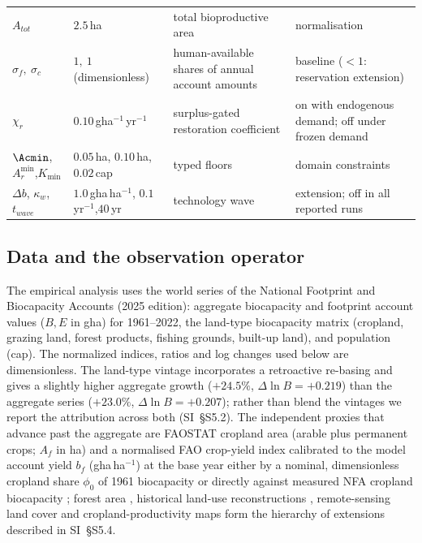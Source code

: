 \begin{table}[!htbp]
\begin{tabularx}{\textwidth}{@{}>{\raggedright\arraybackslash}p{} >{\raggedright\arraybackslash}p{} >{\raggedright\arraybackslash}X >{\raggedright\arraybackslash}p{}@{}}
$A_{tot}$ & $2.5$\,ha & total bioproductive area & normalisation \\
$\sigma_f,\ \sigma_c$ & $1,\ 1$ (dimensionless) & human-available shares of annual account amounts & baseline ($<1$: reservation extension) \\
$\chi_r$ & $0.10$\,gha$^{-1}$\,yr$^{-1}$ & surplus-gated restoration coefficient & on with endogenous demand; off under frozen demand \\
$\Acmin$, $A_r^{\min}$,\newline $K_{\min}$ & $0.05$\,ha, $0.10$\,ha,\newline $0.02$\,cap & typed floors & domain constraints \\
$\Delta b$, $\kappa_w$,\newline $t_{wave}$ & $1.0$\,gha\,ha$^{-1}$, $0.1$\,yr$^{-1}$,\newline $40$\,yr & technology wave & extension; off in all reported runs \\
\bottomrule
\end{tabularx}
\end{table}

\subsection{Data and the observation operator}\label{sec:data}

The empirical analysis uses the world series of the National Footprint and Biocapacity Accounts (2025 edition): aggregate biocapacity and footprint account values ($B,E$ in gha) for 1961--2022, the land-type biocapacity matrix (cropland, grazing land, forest products, fishing grounds, built-up land), and population (cap). The normalized indices, ratios and log changes used below are dimensionless. The land-type vintage incorporates a retroactive re-basing and gives a slightly higher aggregate growth ($+24.5\%$, $\Delta\ln B=+0.219$) than the aggregate series ($+23.0\%$, $\Delta\ln B=+0.207$); rather than blend the vintages we report the attribution across both (SI~\S S5.2). The independent proxies that advance past the aggregate are FAOSTAT cropland area (arable plus permanent crops; $A_f$ in ha) and a normalised FAO crop-yield index calibrated to the model account yield $b_f$ (gha\,ha$^{-1}$) at the base year either by a nominal, dimensionless cropland share $\phi_0$ of 1961 biocapacity or directly against measured NFA cropland biocapacity \citep{FAO2023}; forest area \citep{FAO2020}, historical land-use reconstructions \citep{Hurtt2011,KleinGoldewijk2017}, remote-sensing land cover \citep{ESA2017,Copernicus2019} and cropland-productivity maps \citep{Monfreda2008} form the hierarchy of extensions described in SI~\S S5.4.

